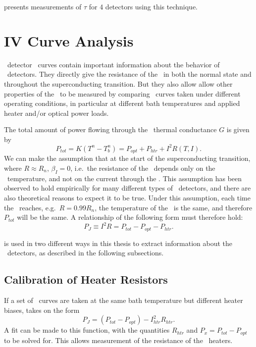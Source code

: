  presents measurements of $\tau$ for 4 detectors using this technique.

\section{\textsc{IV} Curve Analysis}

\TES\ detector \IV\ curves contain important information about the behavior of \TES\ detectors.
They directly give the resistance of the \TES\ in both the normal state and throughout the superconducting transition.
But they also allow allow other properties of the \TES\ to be measured by comparing \IV\ curves taken under different operating conditions, in particular at different bath temperatures and applied heater and/or optical power loads.

The total amount of power flowing through the \TES\ thermal conductance $G$ is given by
\begin{equation}\label{eqn:ch3-tes-ptot}
P_{tot} = K(T^n - T_b^n) = P_{opt} + P_{htr} + I^2 R(T,I).
\end{equation}
We can make the assumption that at the start of the superconducting transition, where $R \approx R_n$, $\beta_I = 0$, i.e.\ the resistance of the \TES\ depends only on the \TES\ temperature, and not on the current through the \TES.
This assumption has been observed to hold empirically for many different types of \TES\ detectors, and there are also theoretical reasons to expect it to be true\cite{bennett_resistance_2013}.
Under this assumption, each time the \TES\ reaches, e.g.\ $R = 0.99R_n$, the temperature of the \TES\ is the same, and therefore $P_{tot}$ will be the same.
A relationship of the following form must therefore hold:
\begin{equation}\label{eqn:ch3-tes-99Rn}
P_{J} \equiv I^2 R = P_{tot} - P_{opt} - P_{htr}.
\end{equation}

 is used in two different ways in this thesis to extract information about the \TES\ detectors, as described in the following subsections.

\subsection{Calibration of Heater Resistors}

If a set of \IV\ curves are taken at the same bath temperature but different heater biases,  takes on the form
\begin{equation}\label{eqn:ch3-rhtr-fit}
P_J = (P_{tot} - P_{opt}) - I_{htr}^2 R_{htr}.
\end{equation}
A fit can be made to this function, with the quantities $R_{htr}$ and $P_x = P_{tot} - P_{opt}$ to be solved for.
This allows measurement of the resistance of the \TES\ heaters.

